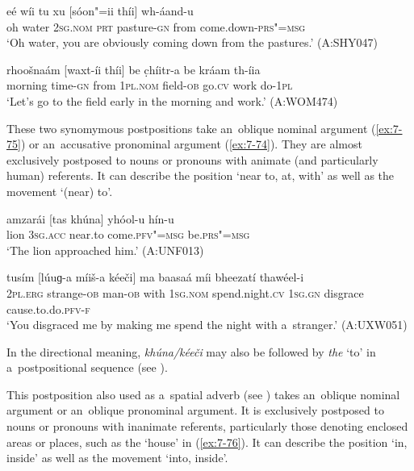 \begin{exe}
\ex
\label{ex:7-72}
\gll eé wíi tu xu [sóon"=ii thíi] wh-áand-u \\
oh water \textsc{2sg.nom} \textsc{prt} pasture-\textsc{gn} from  come.down-\textsc{prs"=msg}  \\
\glt `Oh water, you are obviously coming down from the pastures.' (A:SHY047)
\end{exe}
\begin{exe}
\ex
\label{ex:7-73}
\gll rhoošnaám [waxt-íi thíi] be c̣híitr-a be kráam th-íia  \\
morning  time-\textsc{gn} from \textsc{1pl.nom} field-\textsc{ob} go.\textsc{cv} work do-\textsc{1pl} \\
\glt `Let's go to the field early in the morning and work.' (A:WOM474)
\end{exe}

 These two synomymous postpositions take an~oblique nominal argument (\ref{ex:7-75}) or an~accusative pronominal argument (\ref{ex:7-74}). They are almost exclusively postposed to nouns or pronouns with animate (and particularly human) referents. It can describe the position `near to, at, with' as well as the movement `(near) to'. 

\begin{exe}
\ex
\label{ex:7-74}
\gll amzarái [tas khúna] yhóol-u hín-u \\
lion \textsc{3sg.acc} near.to come.\textsc{pfv"=msg } be.\textsc{prs"=msg} \\
\glt `The lion approached him.' (A:UNF013)
\end{exe}
\begin{exe}
\ex
\label{ex:7-75}
\gll tusím [lúuɡ-a míiš-a kéeči] ma baasaá míi bheezatí thawéel-i \\
\textsc{2pl.erg} strange-\textsc{ob} man-\textsc{ob} with \textsc{1sg.nom} spend.night.\textsc{cv} \textsc{1sg.gn} disgrace cause.to.do.\textsc{pfv-f} \\
\glt `You disgraced me by making me spend the night with a~stranger.' (A:UXW051)
\end{exe}

In the directional meaning, \textit{khúna/kéeči} may also be followed by \textit{the} `to' in a~postpositional sequence (see ).


 This postposition also used as a~spatial adverb (see ) takes an~oblique nominal argument or an~oblique pronominal argument. It is exclusively postposed to nouns or pronouns with inanimate referents, particularly those denoting enclosed areas or places, such as the `house' in (\ref{ex:7-76}). It can describe the position `in, inside' as well as the movement `into, inside'.

